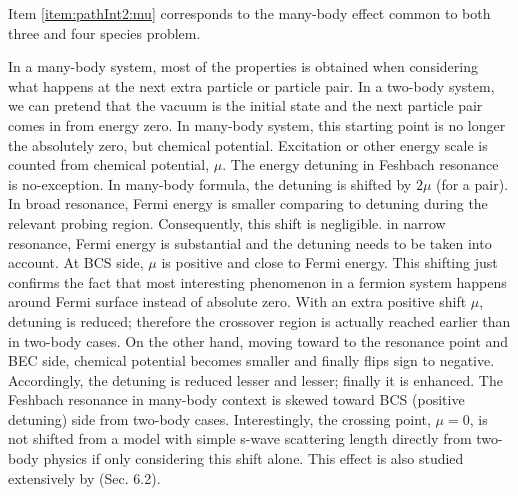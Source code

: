 Item \ref{item:pathInt2:mu} corresponds to the many-body effect  common to both three and four species problem.
\begin{unsure}
In a many-body system, most of the properties is obtained when considering what happens at the next extra particle or particle pair. In a two-body system,  we can pretend that the vacuum is the initial state and the next particle pair comes in from energy zero.  In many-body system, this starting point is no longer the absolutely zero, but chemical potential.  Excitation or other energy scale is counted from chemical potential, $\mu$.  The energy detuning in Feshbach resonance is no-exception.  In many-body formula, the detuning is shifted by $2\mu$ (for a pair).  In broad resonance, Fermi energy is smaller comparing to detuning during the relevant probing region.  Consequently, this shift is negligible.  in narrow resonance, Fermi energy is substantial and the detuning needs to be taken into account.  At BCS side, $\mu$ is positive and close to Fermi energy. This shifting just confirms the fact that most interesting phenomenon in a fermion system happens around Fermi surface instead of absolute zero.  With an extra positive shift $\mu$, detuning is reduced; therefore the crossover region is actually reached earlier than in two-body cases.  On the other hand, moving toward to the resonance point and BEC side, chemical potential becomes smaller and finally flips sign to negative. Accordingly, the detuning is reduced lesser and lesser;  finally it is enhanced.  The Feshbach resonance in many-body context is skewed toward BCS (positive detuning) side from two-body cases.  Interestingly, the crossing point, $\mu=0$, is not shifted from a model with simple  s-wave scattering length directly from two-body physics if only considering this shift alone.  This effect is also  studied extensively by \cite{GurarieNarrow}(Sec. 6.2). 
\end{unsure}



